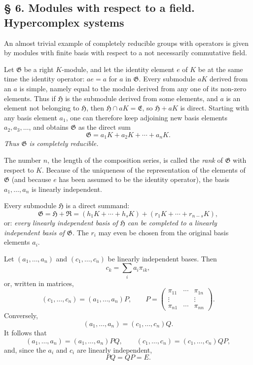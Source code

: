 \documentclass[11pt]{article}
\providecommand{\mG}{\mathfrak{G}}
\providecommand{\mE}{\mathfrak{E}}
\providecommand{\mH}{\mathfrak{H}}
\providecommand{\mR}{\mathfrak{R}}
\begin{document}
\subsection*{§ 6. Modules with respect to a field. Hypercomplex systems}

An almost trivial example of completely reducible groups with operators is given by modules with finite basis with respect to a not necessarily commutative field.

Let $\mG$ be a right $K$-module, and let the identity element $e$ of $K$ be at the same time the identity operator: $ae=a$ for $a$ in $\mG$. Every submodule $aK$ derived from an $a$ is simple, namely equal to the module derived from any one of its non-zero elements. Thus if $\mH$ is the submodule derived from some elements, and $a$ is an element not belonging to $\mH$, then $\mH\cap aK=\mE$, so $\mH+aK$ is direct. Starting with any basis element $a_1$, one can therefore keep adjoining new basis elements $a_2,a_3,\ldots$, and obtains $\mG$ as the direct sum
\[
        \mG=a_1K+a_2K+\cdots+a_nK.
\]
\emph{Thus $\mG$ is completely reducible.}

The number $n$, the length of the composition series, is called the \emph{rank} of $\mG$ with respect to $K$. Because of the uniqueness of the representation of the elements of $\mG$ (and because $e$ has been assumed to be the identity operator), the basis $a_1,\ldots,a_n$ is linearly independent.

Every submodule $\mH$ is a direct summand:
\[
        \mG=\mH+\mR=(h_1K+\cdots+h_sK)+(r_1K+\cdots+r_{n-s}K),
\]
or: \emph{every linearly independent basis of $\mH$ can be completed to a linearly independent basis of $\mG$.} The $r_i$ may even be chosen from the original basis elements $a_i$.

Let $(a_1,\ldots,a_n)$ and $(c_1,\ldots,c_n)$ be linearly independent bases. Then
\[
        c_k=\sum_i a_i\pi_{ik},
\]
or, written in matrices,
\[
        (c_1,\ldots,c_n)=(a_1,\ldots,a_n)P,
        \qquad
        P=\begin{pmatrix}
        \pi_{11}&\cdots&\pi_{1n}\\
        \vdots&&\vdots\\
        \pi_{n1}&\cdots&\pi_{nn}
        \end{pmatrix}.
\]
Conversely,
\[
        (a_1,\ldots,a_n)=(c_1,\ldots,c_n)Q.
\]
It follows that
\[
        (a_1,\ldots,a_n)=(a_1,\ldots,a_n)PQ,
        \qquad
        (c_1,\ldots,c_n)=(c_1,\ldots,c_n)QP,
\]
and, since the $a_i$ and $c_i$ are linearly independent,
\[
        PQ=QP=E.
\]
\end{document}
